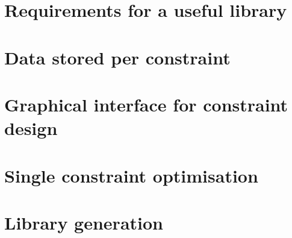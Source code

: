 \section{Requirements for a useful library}


\section{Data stored per constraint}


\section{Graphical interface for constraint design}


\section{Single constraint optimisation}


\section{Library generation} \label{sec:lib}
 